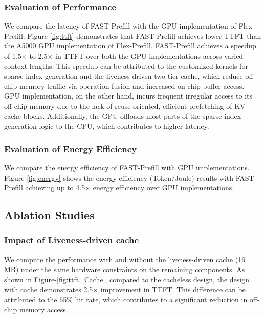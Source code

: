 \documentclass[conference]{IEEEtran}
\begin{document}
\subsubsection{Evaluation of Performance}
We compare the latency of FAST-Prefill with the GPU implementation of Flex-Prefill. %
Figure-\ref{fig:ttft} demonstrates that FAST-Prefill achieves lower TTFT than the A5000 GPU implementation of Flex-Prefill. FAST-Prefill achieves a speedup of 1.5$\times$ to 2.5$\times$ in TTFT over both the GPU implementations across varied context lengths. This speedup can be attributed to the customized kernels for sparse index generation and the liveness-driven two-tier cache, which reduce off-chip memory traffic via operation fusion and increased on-chip buffer access. GPU implementation, on the other hand, incurs frequent irregular access to its off-chip memory due to the lack of reuse-oriented, efficient prefetching of KV cache blocks. Additionally, the GPU offloads most parts of the sparse index generation logic to the CPU, which contributes to higher latency.

\subsubsection{Evaluation of Energy Efficiency}
We compare the energy efficiency of FAST-Prefill with GPU implementations. Figure-\ref{fig:energy} shows the energy efficiency (Token/Joule) results with FAST-Prefill achieving up to 4.5$\times$ energy efficiency over GPU implementations. 




\subsection{Ablation Studies}

\subsubsection{Impact of Liveness-driven cache}
We compute the performance with and without the liveness-driven cache (16 MB) under the same hardware constraints on the remaining components. As shown in Figure-\ref{fig:ttft_Cache}, compared to the cacheless design, the design with cache demonstrates 2.5$\times$ improvement in TTFT. This difference can be attributed to the 65\% hit rate, which contributes to a significant reduction in off-chip memory access.
\end{document}
